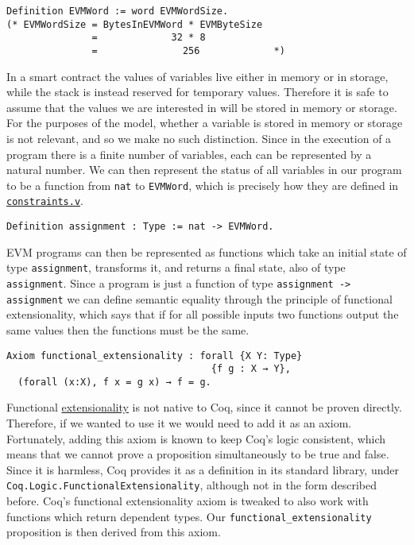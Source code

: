 \begin{verbatim}
Definition EVMWord := word EVMWordSize. 
(* EVMWordSize = BytesInEVMWord * EVMByteSize
               =             32 * 8
               =               256             *)
\end{verbatim}

In a smart contract the values of variables live either in memory or in storage, while the stack is
instead reserved for temporary values. Therefore it is safe to assume that the values we are 
interested in will be stored in memory or storage. For the purposes of the model, whether a variable
is stored in memory or storage is not relevant, and so we make no such distinction. Since in the
execution of a program there is a finite number of variables, each can be represented by a natural
number. We can then represent the status of all variables in our program to be a function from 
\texttt{nat} to \texttt{EVMWord}, which is precisely how they are defined in 
\href{https://github.com/costa-group/forves2/blob/8ec2a66dd44e0c695668d04dbe08f68ef5b56fb4/constraints.v}
{\texttt{constraints.v}}.

\begin{verbatim}
Definition assignment : Type := nat -> EVMWord.
\end{verbatim}

EVM programs can then be represented as functions which take an initial state of type 
\texttt{assignment}, transforms it, and returns a final state, also of type
\texttt{assignment}. Since a program is just a function of type
\texttt{assignment -> assignment} we can define semantic equality through the principle of
functional extensionality, which says that if for all possible inputs two functions output the same
values then the functions must be the same.

\begin{verbatim}
Axiom functional_extensionality : forall {X Y: Type}
                                    {f g : X → Y},
  (forall (x:X), f x = g x) → f = g.
\end{verbatim}

Functional \href{}{extensionality} is not native to Coq, since it cannot be proven directly. Therefore, if we
wanted to use it we would need to add it as an axiom. Fortunately, adding this axiom is known to keep
Coq's logic consistent, which means that we cannot prove a proposition simultaneously to be true and 
false. Since it is harmless, Coq provides it as a definition in its standard library, under 
\texttt{Coq.Logic.FunctionalExtensionality}, although not in the form described before. Coq's functional
extensionality axiom is tweaked to also work with functions which return dependent types. Our 
\texttt{functional_extensionality} proposition is then derived from this axiom.

